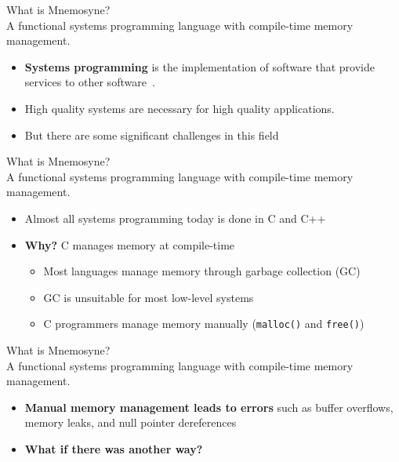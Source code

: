 \documentclass{beamer}
\begin{document}
\begin{frame}
\huge What is Mnemosyne? \normalsize \\
A functional \alert<1->{systems programming} language with compile-time memory management.
\begin{itemize}
\item<1->
    \textbf{Systems programming} is the implementation of software that provide services to other software~\cite{Narten:2003:SP:1074100.1074850,Shapiro:2006:PLC:1215995.1216004}.
    \item <3-> High quality systems are necessary for high quality applications.
\item <4-> But there are some significant challenges in this field~\cite{whyrust,Shapiro:2006:PLC:1215995.1216004}
\end{itemize}
\end{frame}

\begin{frame}
\huge What is Mnemosyne? \normalsize \\
A functional systems programming language with \alert<1->{compile-time memory management}.
\begin{itemize}
    \item Almost all systems programming today is done in C and C++
    \item<2-> \textbf{Why?} C manages memory at compile-time
    \begin{itemize}
        \item<3-> Most languages manage memory through garbage collection (GC)~\cite{Bartley:2003:GC:1074100.1074419}
        \item<3-> GC is unsuitable for most low-level systems
        \item<3-> C programmers manage memory manually (\texttt{malloc()} and \texttt{free()})
    \end{itemize}
\end{itemize}
\end{frame}

\begin{frame}
\huge What is Mnemosyne? \normalsize \\
A functional systems programming language with \alert<1->{compile-time memory management}.
\begin{itemize}
    \item \textbf{Manual memory management leads to errors} such as buffer overflows, memory leaks, and null pointer dereferences
    \item \textbf{What if there was another way?}
\end{itemize}
\end{frame}
\end{document}
